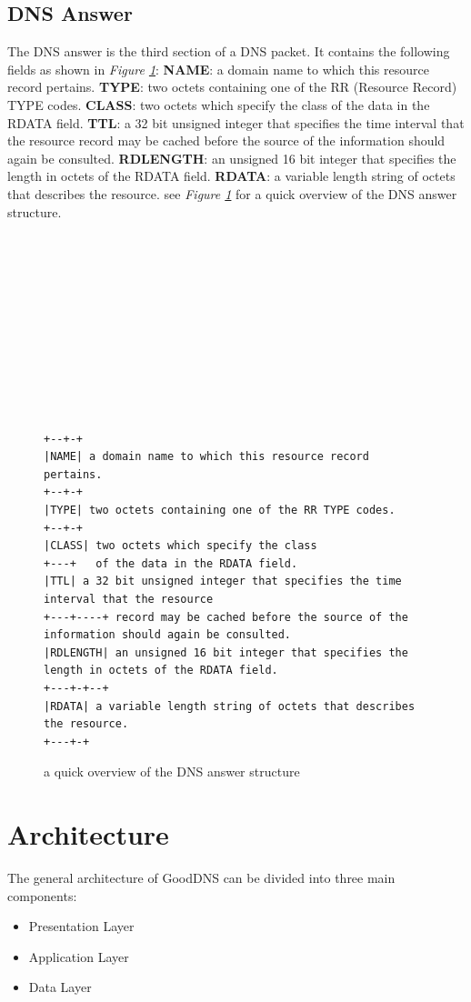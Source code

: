 \documentclass[12pt]{article}
\begin{document}
\subsection{DNS Answer}
The DNS answer is the third section of a DNS packet. It contains the following fields as shown in \textit{Figure \ref{fig:answer}}:
\textbf{NAME}: a domain name to which this resource record pertains.
\textbf{TYPE}: two octets containing one of the RR (Resource Record) TYPE codes.
\textbf{CLASS}: two octets which specify the class of the data in the RDATA field.
\textbf{TTL}: a 32 bit unsigned integer that specifies the time interval that the resource record may be cached before the source of the information should again be consulted.
\textbf{RDLENGTH}: an unsigned 16 bit integer that specifies the length in octets of the RDATA field.
\textbf{RDATA}: a variable length string of octets that describes the resource.
see \textit{Figure \ref{fig:answer}} for a quick overview of the DNS answer structure.
\\
\\
\\
\\
\\
\\
\\
\\
\\
\\
\\
\\

\begin{figure}[h]
    \begin{lstlisting}[basicstyle=\tiny]
+--+-+
|NAME| a domain name to which this resource record pertains.
+--+-+
|TYPE| two octets containing one of the RR TYPE codes.
+--+-+
|CLASS| two octets which specify the class
+---+   of the data in the RDATA field.
|TTL| a 32 bit unsigned integer that specifies the time interval that the resource
+---+----+ record may be cached before the source of the information should again be consulted.
|RDLENGTH| an unsigned 16 bit integer that specifies the length in octets of the RDATA field.
+---+-+--+
|RDATA| a variable length string of octets that describes the resource.
+---+-+
    \end{lstlisting}
\caption{a quick overview of the DNS answer structure}
\label{fig:answer}
\end{figure}

\section{Architecture}
    The general architecture of GoodDNS can be divided into three main components:
    \begin{itemize}
        \item Presentation Layer
        \item Application Layer
        \item Data Layer
    \end{itemize}
\end{document}
